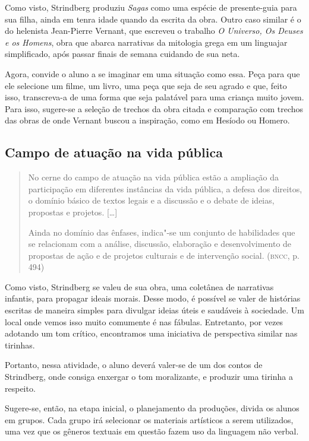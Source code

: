 \documentclass[12pt]{extarticle}
\begin{document}
Como visto, Strindberg produziu \emph{Sagas} como uma espécie de
presente-guia para sua filha, ainda em tenra idade quando da escrita
da obra. Outro caso similar é o do helenista Jean-Pierre Vernant, que
escreveu o trabalho \emph{O Universo, Os Deuses e os Homens}, obra que
abarca narrativas da mitologia grega em um linguajar simplificado,
após passar finais de semana cuidando de sua neta.

Agora, convide o aluno a se imaginar em uma situação como essa. Peça
para que ele selecione um filme, um livro, uma peça que seja de seu
agrado e que, feito isso, transcreva-a de uma forma que seja palatável
para uma criança muito jovem. Para isso, sugere-se a seleção de trechos
da obra citada e comparação com trechos das obras de onde Vernant buscou
a inspiração, como em Hesíodo ou Homero.


\subsection{Campo de atuação na vida pública}

\begin{quote}
No cerne do campo de atuação na vida pública estão a ampliação da
participação em diferentes instâncias da vida pública, a defesa dos
direitos, o domínio básico de textos legais e a discussão e o debate de
ideias, propostas e projetos. {[}\ldots{}{]}

Ainda no domínio das ênfases, indica"-se um conjunto de habilidades que
se relacionam com a análise, discussão, elaboração e desenvolvimento de
propostas de ação e de projetos culturais e de intervenção social.
(\textsc{bncc}, p. 494)
\end{quote}


Como visto, Strindberg se valeu de sua obra, uma coletânea de
narrativas infantis, para propagar ideais morais. Desse modo, é
possível se valer de histórias escritas de maneira simples para
divulgar ideias úteis e saudáveis à sociedade. Um local onde vemos
isso muito comumente é nas fábulas. Entretanto, por vezes adotando um
tom crítico, encontramos uma iniciativa de perspectiva similar nas
tirinhas.


Portanto, nessa atividade, o aluno deverá valer-se de um dos contos de
Strindberg, onde consiga enxergar o tom moralizante, e produzir uma
tirinha a respeito.

Sugere-se, então, na etapa inicial, o planejamento da produções, divida
os alunos em grupos. Cada grupo irá selecionar os materiais artísticos a
serem utilizados, uma vez que os gêneros textuais em questão fazem uso
da linguagem não verbal.
\end{document}
